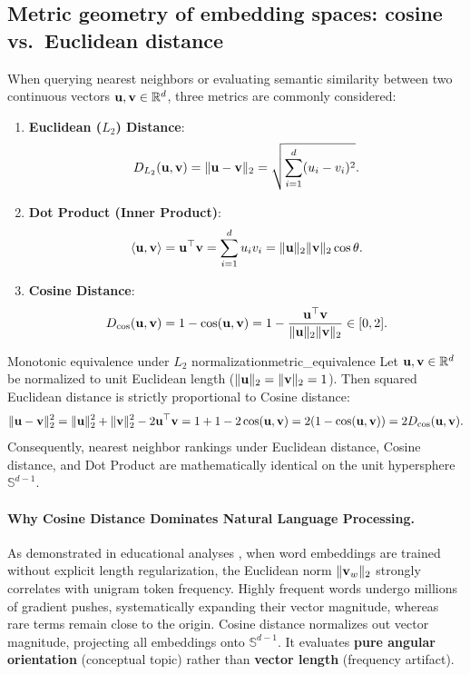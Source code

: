 \documentclass[../../main.tex]{subfiles}
\begin{document}
\subsection{Metric geometry of embedding spaces: cosine vs.~Euclidean distance}
\label{subsec:metric_geometry}

When querying nearest neighbors or evaluating semantic similarity between two continuous vectors $\mathbf{u}, \mathbf{v} \in \mathbb{R}^d$, three metrics are commonly considered:
\begin{enumerate}
    \item \textbf{Euclidean ($L_2$) Distance}:
    \begin{equation}
    \label{eq:euclidean_dist}
    D_{L_2}(\mathbf{u}, \mathbf{v}) = \|\mathbf{u} - \mathbf{v}\|_2 = \sqrt{\sum_{i=1}^d (u_i - v_i)^2}.
    \end{equation}
    \item \textbf{Dot Product (Inner Product)}:
    \begin{equation}
    \label{eq:dot_prod_metric}
    \langle\mathbf{u}, \mathbf{v}\rangle = \mathbf{u}^\top \mathbf{v} = \sum_{i=1}^d u_i v_i = \|\mathbf{u}\|_2 \|\mathbf{v}\|_2 \cos \theta.
    \end{equation}
    \item \textbf{Cosine Distance}:
    \begin{equation}
    \label{eq:cosine_dist_def}
    D_{\cos}(\mathbf{u}, \mathbf{v}) = 1 - \cos(\mathbf{u}, \mathbf{v}) = 1 - \frac{\mathbf{u}^\top \mathbf{v}}{\|\mathbf{u}\|_2 \|\mathbf{v}\|_2} \in [0, 2].
    \end{equation}
\end{enumerate}

\begin{theorem}{Monotonic equivalence under $L_2$ normalization}{metric_equivalence}
Let $\mathbf{u}, \mathbf{v} \in \mathbb{R}^d$ be normalized to unit Euclidean length ($\|\mathbf{u}\|_2 = \|\mathbf{v}\|_2 = 1$). Then squared Euclidean distance is strictly proportional to Cosine distance:
\begin{equation}
\label{eq:unit_norm_equiv}
\|\mathbf{u} - \mathbf{v}\|_2^2 = \|\mathbf{u}\|_2^2 + \|\mathbf{v}\|_2^2 - 2 \mathbf{u}^\top \mathbf{v} = 1 + 1 - 2 \cos(\mathbf{u}, \mathbf{v}) = 2(1 - \cos(\mathbf{u}, \mathbf{v})) = 2 D_{\cos}(\mathbf{u}, \mathbf{v}).
\end{equation}
Consequently, nearest neighbor rankings under Euclidean distance, Cosine distance, and Dot Product are mathematically identical on the unit hypersphere $\mathbb{S}^{d-1}$.
\end{theorem}

\paragraph{Why Cosine Distance Dominates Natural Language Processing.}
As demonstrated in educational analyses \cite{enkk2023embeddings}, when word embeddings are trained without explicit length regularization, the Euclidean norm $\|\mathbf{v}_w\|_2$ strongly correlates with unigram token frequency. Highly frequent words undergo millions of gradient pushes, systematically expanding their vector magnitude, whereas rare terms remain close to the origin.
Cosine distance normalizes out vector magnitude, projecting all embeddings onto $\mathbb{S}^{d-1}$. It evaluates \textbf{pure angular orientation} (conceptual topic) rather than \textbf{vector length} (frequency artifact).
\end{document}

